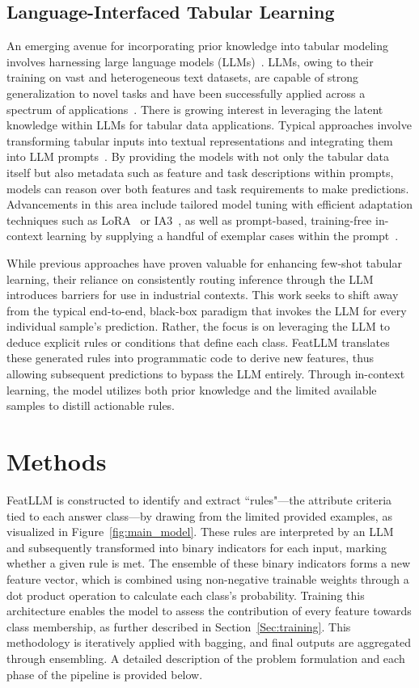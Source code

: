 \subsection{Language-Interfaced Tabular Learning} An emerging avenue for incorporating prior knowledge into tabular modeling involves harnessing large language models (LLMs)~\cite{anil2023palm,openai2023gpt4}. LLMs, owing to their training on vast and heterogeneous text datasets, are capable of strong generalization to novel tasks and have been successfully applied across a spectrum of applications~\cite{brown2020language}. There is growing interest in leveraging the latent knowledge within LLMs for tabular data applications. Typical approaches involve transforming tabular inputs into textual representations and integrating them into LLM prompts~\cite{dinh2022lift,hegselmann2023tabllm,wang2023anypredict}. By providing the models with not only the tabular data itself but also metadata such as feature and task descriptions within prompts, models can reason over both features and task requirements to make predictions. Advancements in this area include tailored model tuning with efficient adaptation techniques such as LoRA~\cite{hu2021lora} or IA3~\cite{liu2022few}, as well as prompt-based, training-free in-context learning by supplying a handful of exemplar cases within the prompt~\cite{dinh2022lift,hegselmann2023tabllm,nam2023semi,slack2023tablet}.

While previous approaches have proven valuable for enhancing few-shot tabular learning, their reliance on consistently routing inference through the LLM introduces barriers for use in industrial contexts. This work seeks to shift away from the typical end-to-end, black-box paradigm that invokes the LLM for every individual sample’s prediction. Rather, the focus is on leveraging the LLM to deduce explicit rules or conditions that define each class. \textsf{FeatLLM} translates these generated rules into programmatic code to derive new features, thus allowing subsequent predictions to bypass the LLM entirely. Through in-context learning, the model utilizes both prior knowledge and the limited available samples to distill actionable rules.

\section{Methods}
\textsf{FeatLLM} is constructed to identify and extract ``rules"—the attribute criteria tied to each answer class—by drawing from the limited provided examples, as visualized in Figure~\ref{fig:main_model}. These rules are interpreted by an LLM and subsequently transformed into binary indicators for each input, marking whether a given rule is met. The ensemble of these binary indicators forms a new feature vector, which is combined using non-negative trainable weights through a dot product operation to calculate each class's probability. Training this architecture enables the model to assess the contribution of every feature towards class membership, as further described in Section~\ref{Sec:training}. This methodology is iteratively applied with bagging, and final outputs are aggregated through ensembling. A detailed description of the problem formulation and each phase of the pipeline is provided below.

